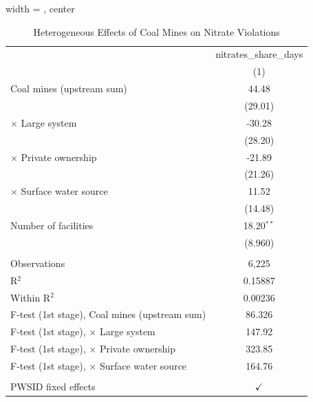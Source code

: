 
\begin{table}[htbp]
   \caption{\label{tab:het_unified} Heterogeneous Effects of Coal Mines on Nitrate Violations}
   \bigskip
   \centering
   \begin{adjustbox}{width = \textwidth, center}
      \begin{tabular}{lc}
         \toprule
                                                       & nitrates\_share\_days\\    
                                                       & (1)\\  
         \midrule 
         Coal mines (upstream sum)                     & 44.48\\   
                                                       & (29.01)\\   
           × Large system                              & -30.28\\   
                                                       & (28.20)\\   
           × Private ownership                         & -21.89\\   
                                                       & (21.26)\\   
           × Surface water source                      & 11.52\\   
                                                       & (14.48)\\   
         Number of facilities                          & 18.20$^{**}$\\   
                                                       & (8.960)\\   
          \\
         Observations                                  & 6,225\\  
         R$^2$                                         & 0.15887\\  
         Within R$^2$                                  & 0.00236\\  
         F-test (1st stage), Coal mines (upstream sum) & 86.326\\  
         F-test (1st stage),   × Large system          & 147.92\\  
         F-test (1st stage),   × Private ownership     & 323.85\\  
         F-test (1st stage),   × Surface water source  & 164.76\\  
          \\
         PWSID fixed effects                           & $\checkmark$\\   

\end{tabular}
\end{adjustbox}
\end{table}
